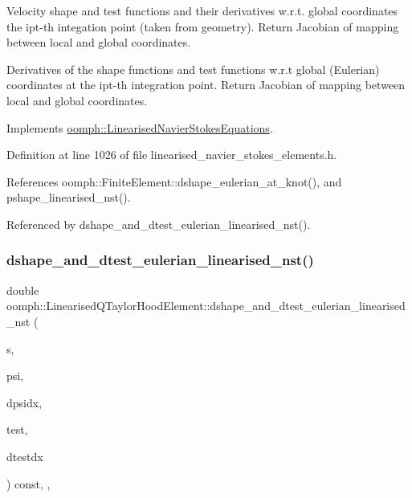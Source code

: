 Velocity shape and test functions and their derivatives w.\+r.\+t. global coordinates the ipt-\/th integation point (taken from geometry). Return Jacobian of mapping between local and global coordinates. 

Derivatives of the shape functions and test functions w.\+r.\+t global (Eulerian) coordinates at the ipt-\/th integration point. Return Jacobian of mapping between local and global coordinates. 

Implements \hyperlink{classoomph_1_1LinearisedNavierStokesEquations_a87a2102128bc071afa16f2e950724ee3}{oomph\+::\+Linearised\+Navier\+Stokes\+Equations}.



Definition at line 1026 of file linearised\+\_\+navier\+\_\+stokes\+\_\+elements.\+h.



References oomph\+::\+Finite\+Element\+::dshape\+\_\+eulerian\+\_\+at\+\_\+knot(), and pshape\+\_\+linearised\+\_\+nst().



Referenced by dshape\+\_\+and\+\_\+dtest\+\_\+eulerian\+\_\+linearised\+\_\+nst().

\mbox{\label{classoomph_1_1LinearisedQTaylorHoodElement_ae6cdd6036b58e98ddabffddb645270be}} 
\subsubsection{\texorpdfstring{dshape\+\_\+and\+\_\+dtest\+\_\+eulerian\+\_\+linearised\+\_\+nst()}{dshape\_and\_dtest\_eulerian\_linearised\_nst()}}
{\footnotesize\ttfamily double oomph\+::\+Linearised\+Q\+Taylor\+Hood\+Element\+::dshape\+\_\+and\+\_\+dtest\+\_\+eulerian\+\_\+linearised\+\_\+nst (\begin{DoxyParamCaption}\item[{const \hyperlink{classoomph_1_1Vector}{Vector}$<$ double $>$ \&}]{s,  }\item[{\hyperlink{classoomph_1_1Shape}{Shape} \&}]{psi,  }\item[{\hyperlink{classoomph_1_1DShape}{D\+Shape} \&}]{dpsidx,  }\item[{\hyperlink{classoomph_1_1Shape}{Shape} \&}]{test,  }\item[{\hyperlink{classoomph_1_1DShape}{D\+Shape} \&}]{dtestdx }\end{DoxyParamCaption}) const\hspace{0.3cm}{\ttfamily [inline]}, {\ttfamily [protected]}, {\ttfamily [virtual]}}



